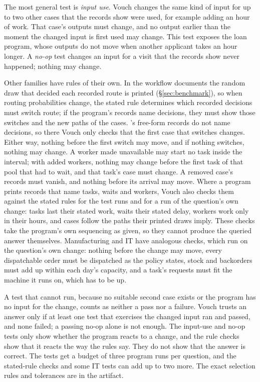 The most general test is \emph{input use}. Vouch changes the same kind of input for up to two other cases that the records show were used, for example adding an hour of work. That case's outputs must change, and no output earlier than the moment the changed input is first used may change. This test exposes the loan program, whose outputs do not move when another applicant takes an hour longer. A \emph{no-op} test changes an input for a visit that the records show never happened; nothing may change.

Other families have rules of their own. In the workflow documents the random draw that decided each recorded route is printed (\S\ref{sec:benchmark}), so when routing probabilities change, the stated rule determines which recorded decisions must switch route; if the program's records name decisions, they must show those switches and the new paths of the cases. \otf's free-form records do not name decisions, so there Vouch only checks that the first case that switches changes. Either way, nothing before the first switch may move, and if nothing switches, nothing may change. A worker made unavailable may start no task inside the interval; with added workers, nothing may change before the first task of that pool that had to wait, and that task's case must change. A removed case's records must vanish, and nothing before its arrival may move. Where a program prints records that name tasks, waits and workers, Vouch also checks them against the stated rules for the test runs and for a run of the question's own change: tasks last their stated work, waits their stated delay, workers work only in their hours, and cases follow the paths their printed draws imply. These checks take the program's own sequencing as given, so they cannot produce the queried answer themselves. Manufacturing and IT have analogous checks, which run on the question's own change: nothing before the change may move, every dispatchable order must be dispatched as the policy states, stock and backorders must add up within each day's capacity, and a task's requests must fit the machine it runs on, which has to be up.

A test that cannot run, because no suitable second case exists or the program has no input for the change, counts as neither a pass nor a failure. Vouch trusts an answer only if at least one test that exercises the changed input ran and passed, and none failed; a passing no-op alone is not enough. The input-use and no-op tests only show whether the program reacts to a change, and the rule checks show that it reacts the way the rules say. They do not show that the answer is correct. The tests get a budget of three program runs per question, and the stated-rule checks and some IT tests can add up to two more. The exact selection rules and tolerances are in the artifact.

